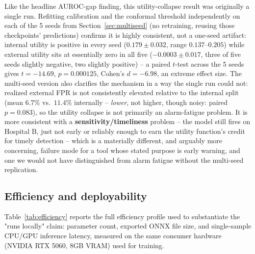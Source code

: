 \documentclass[11pt]{article}
\begin{document}
Like the headline AUROC-gap finding, this utility-collapse result was originally a single run. Refitting calibration and the conformal threshold independently on each of the 5 seeds from Section~\ref{sec:multiseed} (no retraining, reusing those checkpoints' predictions) confirms it is highly consistent, not a one-seed artifact: internal utility is positive in every seed ($0.179\pm0.032$, range $0.137$--$0.205$) while external utility sits at essentially zero in all five ($-0.0003\pm0.017$, three of five seeds slightly negative, two slightly positive) -- a paired $t$-test across the 5 seeds gives $t=-14.69$, $p=0.000125$, Cohen's $d=-6.98$, an extreme effect size. The multi-seed version also clarifies the mechanism in a way the single run could not: realized external FPR is not consistently elevated relative to the internal split (mean $6.7\%$ vs.\ $11.4\%$ internally -- \emph{lower}, not higher, though noisy: paired $p=0.083$), so the utility collapse is not primarily an alarm-fatigue problem. It is more consistent with a \textbf{sensitivity/timeliness} problem -- the model still fires on Hospital B, just not early or reliably enough to earn the utility function's credit for timely detection -- which is a materially different, and arguably more concerning, failure mode for a tool whose stated purpose is early warning, and one we would not have distinguished from alarm fatigue without the multi-seed replication.

\begin{table}[t]
\centering
\caption{Alarm burden and normalized utility at each model's own conformal threshold ($\alpha=0.10$, fit on validation), all six models, internal test and external test.}
\label{tab:utility_conformal}
\resizebox{\linewidth}{!}{}
\end{table}

\subsection{Efficiency and deployability}
Table~\ref{tab:efficiency} reports the full efficiency profile used to substantiate the "runs locally" claim: parameter count, exported ONNX file size, and single-sample CPU/GPU inference latency, measured on the same consumer hardware (NVIDIA RTX 5060, 8GB VRAM) used for training.

\begin{table}[t]
\centering
\caption{TinySepsis efficiency profile.}
\label{tab:efficiency}

\end{table}
\end{document}
